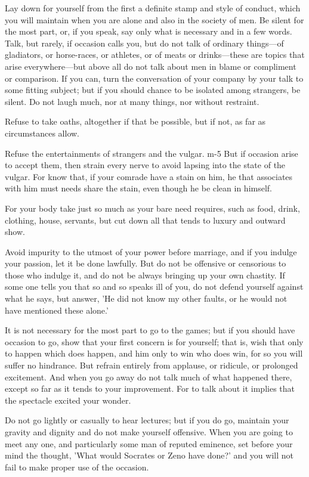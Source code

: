 Lay down  for yourself from  the first a definite  stamp and style  of conduct,
which you will maintain  when you are alone and also in the  society of men. Be
silent for the most part, or, if you speak, say only what is necessary and in a
few  words. Talk,  but  rarely, if  occasion  calls  you, but  do  not talk  of
ordinary things—of  gladiators, or horse-races,  or athletes, or of  meats or
drinks—these are  topics that  arise everywhere—but above  all do  not talk
about  men  in  blame  or  compliment  or comparison.  If  you  can,  turn  the
conversation of your company  by your talk to some fitting  subject; but if you
should chance to be isolated among strangers, be silent. Do not laugh much, nor
at many things, nor without restraint.

Refuse to  take oaths, altogether if  that be possible,  but if not, as  far as
circumstances allow.

Refuse the  entertainments of  strangers and  the vulgar.  m-5 But  if occasion
arise to accept them,  then strain every nerve to avoid  lapsing into the state
of the  vulgar. For know  that, if your  comrade have a  stain on him,  he that
associates with  him must  needs share the  stain, even though  he be  clean in
himself.

For your  body take  just so  much as your  bare need  requires, such  as food,
drink, clothing,  house, servants, but  cut down all  that tends to  luxury and
outward show.

Avoid impurity to the utmost of your  power before marriage, and if you indulge
your passion, let it be done lawfully. But do not be offensive or censorious to
those who indulge  it, and do not  be always bringing up your  own chastity. If
some one  tells you that so  and so speaks ill  of you, do not  defend yourself
against what he says, but answer, 'He did not know my other faults, or he would
not have mentioned these alone.'

It is  not necessary for the  most part to go  to the games; but  if you should
have occasion  to go, show  that your first concern  is for yourself;  that is,
wish that only to  happen which does happen, and him only to  win who does win,
for so  you will suffer  no hindrance. But  refrain entirely from  applause, or
ridicule, or  prolonged excitement. And  when you go away  do not talk  much of
what happened there, except so far as it tends to your improvement. For to talk
about it implies that the spectacle excited your wonder.

Do not go lightly or casually to hear lectures; but if you do go, maintain your
gravity and dignity and  do not make yourself offensive. When  you are going to
meet any  one, and particularly some  man of reputed eminence,  set before your
mind the  thought, 'What would  Socrates or Zeno have  done?' and you  will not
fail to make proper use of the occasion.


